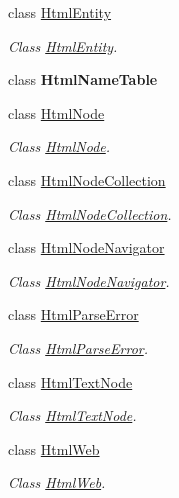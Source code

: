 \begin{DoxyCompactItemize}
class \hyperlink{class_html_agility_pack_1_1_html_entity}{Html\+Entity}
\begin{DoxyCompactList}\small\item\em Class \hyperlink{class_html_agility_pack_1_1_html_entity}{Html\+Entity}. \end{DoxyCompactList}\item 
class {\bfseries Html\+Name\+Table}
\item 
class \hyperlink{class_html_agility_pack_1_1_html_node}{Html\+Node}
\begin{DoxyCompactList}\small\item\em Class \hyperlink{class_html_agility_pack_1_1_html_node}{Html\+Node}. \end{DoxyCompactList}\item 
class \hyperlink{class_html_agility_pack_1_1_html_node_collection}{Html\+Node\+Collection}
\begin{DoxyCompactList}\small\item\em Class \hyperlink{class_html_agility_pack_1_1_html_node_collection}{Html\+Node\+Collection}. \end{DoxyCompactList}\item 
class \hyperlink{class_html_agility_pack_1_1_html_node_navigator}{Html\+Node\+Navigator}
\begin{DoxyCompactList}\small\item\em Class \hyperlink{class_html_agility_pack_1_1_html_node_navigator}{Html\+Node\+Navigator}. \end{DoxyCompactList}\item 
class \hyperlink{class_html_agility_pack_1_1_html_parse_error}{Html\+Parse\+Error}
\begin{DoxyCompactList}\small\item\em Class \hyperlink{class_html_agility_pack_1_1_html_parse_error}{Html\+Parse\+Error}. \end{DoxyCompactList}\item 
class \hyperlink{class_html_agility_pack_1_1_html_text_node}{Html\+Text\+Node}
\begin{DoxyCompactList}\small\item\em Class \hyperlink{class_html_agility_pack_1_1_html_text_node}{Html\+Text\+Node}. \end{DoxyCompactList}\item 
class \hyperlink{class_html_agility_pack_1_1_html_web}{Html\+Web}
\begin{DoxyCompactList}\small\item\em Class \hyperlink{class_html_agility_pack_1_1_html_web}{Html\+Web}. \end{DoxyCompactList}\item 

\end{DoxyCompactItemize}
